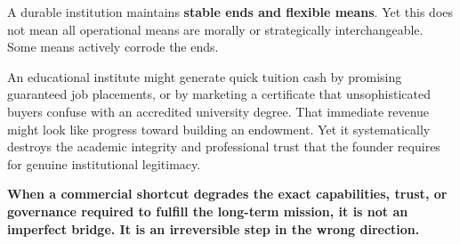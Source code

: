 A durable institution maintains \textbf{stable ends and flexible means}. Yet this does not mean all operational means are morally or strategically interchangeable. Some means actively corrode the ends.

An educational institute might generate quick tuition cash by promising guaranteed job placements, or by marketing a certificate that unsophisticated buyers confuse with an accredited university degree. That immediate revenue might look like progress toward building an endowment. Yet it systematically destroys the academic integrity and professional trust that the founder requires for genuine institutional legitimacy.

\textbf{When a commercial shortcut degrades the exact capabilities, trust, or governance required to fulfill the long-term mission, it is not an imperfect bridge. It is an irreversible step in the wrong direction.}
